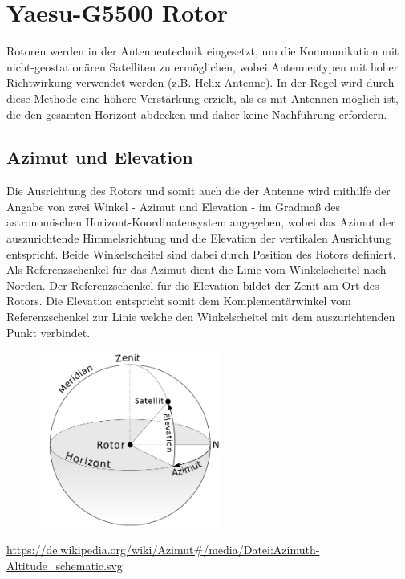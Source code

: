 \chapter{Yaesu-G5500 Rotor}
Rotoren werden in der Antennentechnik eingesetzt, um die Kommunikation mit nicht-geostationären Satelliten zu ermöglichen, wobei Antennentypen mit hoher Richtwirkung verwendet werden (z.B. Helix-Antenne). In der Regel wird durch diese Methode eine höhere Verstärkung erzielt, als es mit Antennen möglich ist, die den gesamten Horizont abdecken und daher keine Nachführung erfordern. 
\section{Azimut und Elevation}
Die Ausrichtung des Rotors und somit auch die der Antenne wird mithilfe der Angabe von zwei Winkel - Azimut und Elevation - im Gradmaß des astronomischen Horizont-Koordinatensystem angegeben, wobei das Azimut der auszurichtende Himmelsrichtung und die Elevation der vertikalen Ausrichtung entspricht. Beide Winkelscheitel sind dabei durch Position des Rotors definiert. Als Referenzschenkel für das Azimut dient die Linie vom Winkelscheitel nach Norden. Der Referenzschenkel für die Elevation bildet der Zenit am Ort des Rotors. Die Elevation entspricht somit dem Komplementärwinkel vom Referenzschenkel zur Linie welche den Winkelscheitel mit dem auszurichtenden Punkt verbindet.

\begin{figure}[H]
	\centering
	\includegraphics[width=6cm]{../ref/Azimuth-Altitude_schematic_satellit.png}
	\label{fig:Wndg_aufgerollt}
\end{figure}

\url{https://de.wikipedia.org/wiki/Azimut#/media/Datei:Azimuth-Altitude_schematic.svg}